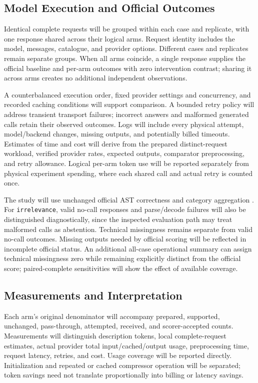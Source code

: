 \documentclass[conference]{IEEEtran}
\begin{document}
\subsection{Model Execution and Official Outcomes}
Identical complete requests will be grouped within each case and replicate, with one response shared across their logical arms. Request identity includes the model, messages, catalogue, and provider options. Different cases and replicates remain separate groups. When all arms coincide, a single response supplies the official baseline and per-arm outcomes with zero intervention contrast; sharing it across arms creates no additional independent observations.

A counterbalanced execution order, fixed provider settings and concurrency, and recorded caching conditions will support comparison. A bounded retry policy will address transient transport failures; incorrect answers and malformed generated calls retain their observed outcomes. Logs will include every physical attempt, model/backend changes, missing outputs, and potentially billed timeouts. Estimates of time and cost will derive from the prepared distinct-request workload, verified provider rates, expected outputs, comparator preprocessing, and retry allowance. Logical per-arm token use will be reported separately from physical experiment spending, where each shared call and actual retry is counted once.

The study will use unchanged official AST correctness and category aggregation \cite{bfcladapter,bfclast,bfclrunner}. For \texttt{irrelevance}, valid no-call responses and parse/decode failures will also be distinguished diagnostically, since the inspected evaluation path may treat malformed calls as abstention. Technical missingness remains separate from valid no-call outcomes. Missing outputs needed by official scoring will be reflected in incomplete official status. An additional all-case operational summary can assign technical missingness zero while remaining explicitly distinct from the official score; paired-complete sensitivities will show the effect of available coverage.

\subsection{Measurements and Interpretation}
Each arm's original denominator will accompany prepared, supported, unchanged, pass-through, attempted, received, and scorer-accepted counts. Measurements will distinguish description tokens, local complete-request estimates, actual provider total input/cached/output usage, preprocessing time, request latency, retries, and cost. Usage coverage will be reported directly. Initialization and repeated or cached compressor operation will be separated; token savings need not translate proportionally into billing or latency savings.
\end{document}
